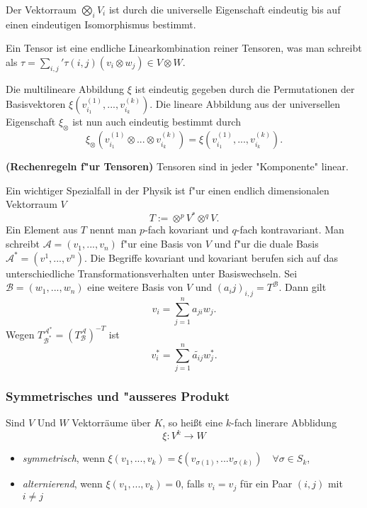 \documentclass[9pt, a4paper, twocolumn, landscape]{article}
\begin{document}
\begin{remark}
Der Vektorraum $\bigotimes\limits_i V_i$ ist durch die universelle Eigenschaft eindeutig bis auf einen eindeutigen Isomorphismus bestimmt. 
\end{remark}

\begin{remark}
Ein Tensor ist eine endliche Linearkombination reiner Tensoren, was man schreibt als $\tau = \sum\limits_{i, j} ' \tau(i, j) (v_i \otimes w_j) \in V \otimes W$.

Die multilineare Abbildung $\xi$ ist eindeutig gegeben durch die Permutationen der Basisvektoren $\xi(v_{i_1}^{(1)}, ..., v_{i_k}^{(k)})$.
Die lineare Abbildung aus der universellen Eigenschaft $\xi_\otimes$ ist nun auch eindeutig bestimmt durch 
$$
\xi_\otimes(v_{i_1}^{(1)} \otimes ... \otimes v_{i_k}^{(k)}) = \xi(v_{i_1}^{(1)}, ..., v_{i_k}^{(k)}).
$$
\end{remark}

\begin{remark} \textbf{(Rechenregeln f"ur Tensoren)}
Tensoren sind in jeder  "Komponente"  linear.
\end{remark}


\begin{remark}
Ein wichtiger Spezialfall in der Physik ist f"ur einen endlich dimensionalen Vektorraum $V$
$$
T:= \otimes^p V^* \otimes^q V.
$$
Ein Element aus $T$ nennt man $p$-fach kovariant und $q$-fach kontravariant. Man schreibt $\mathcal{A} = (v_1, ..., v_n)$ f"ur eine Basis von $V$ und f"ur die duale Basis $\mathcal{A}^* = (v^1, ..., v^n)$.
Die Begriffe kovariant und kovariant berufen sich auf das unterschiedliche Transformationsverhalten unter Basiswechseln. Sei $\mathcal{B} = (w_1, ..., w_n)$ eine weitere Basis von $V$ und $(a_ij)_{i, j} = T^\mathcal{B}$. Dann gilt
$$
v_i =\sum\limits_{j = 1}^n a_{ji}w_j.
$$
Wegen $T^{\mathcal{A}^*}_{\mathcal{B}^*} = (T^{\mathcal{A}}_{\mathcal{B}})^{-T}$ ist 
$$
v_i^* =\sum\limits_{j = 1}^n \tilde{a_{ij}}w_j^*.
$$
\end{remark}


\subsubsection{Symmetrisches und "ausseres Produkt}
\begin{definition}
Sind $V$ Und $W$ Vektorräume über $K$, so heißt eine $k$-fach linerare Abblidung
$$
\xi: V^k \rightarrow W
$$
\begin{itemize}
\item  \emph{symmetrisch}, wenn $\xi(v_1,...,v_k) = \xi(v_{\sigma(1)},...v_{\sigma(k)})\quad \forall \sigma \in S_k$,
\item \emph{alternierend}, wenn $\xi(v_1,...,v_k) = 0 $, falls $ v_i = v_j$ für ein Paar $(i,j)$ mit $i \neq j$
\end{itemize}
\end{definition}
\end{document}
